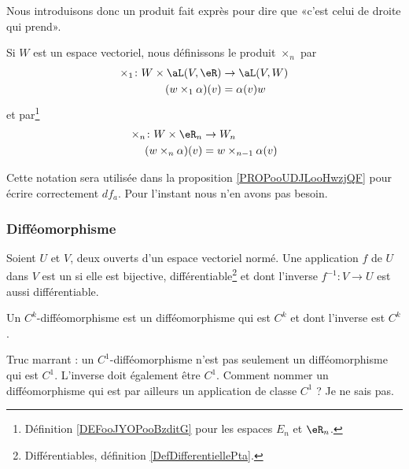 Nous introduisons donc un produit fait exprès pour dire que «c'est celui de droite qui prend».
\begin{definition}       \label{DEFooLULCooYjBEaZ}
	Si \( W\) est un espace vectoriel, nous définissons le produit \( \times_n\) par
	\begin{equation}
		\begin{aligned}
			\times_1\colon W\times \aL(V,\eR) & \to \aL(V,W) \\
			(w\times_1\alpha)(v)              & =\alpha(v)w
		\end{aligned}
	\end{equation}
	et par\footnote{Définition \ref{DEFooJYOPooBzditG} pour les espaces \( E_n\) et \( \eR_n\).}
	\begin{equation}
		\begin{aligned}
			\times_n\colon W\times \eR_n & \to W_n                  \\
			(w\times_n\alpha)(v)         & =w\times_{n-1} \alpha(v)
		\end{aligned}
	\end{equation}
\end{definition}
Cette notation sera utilisée dans la proposition \ref{PROPooUDJLooHwzjQF} pour écrire correctement \( df_a\). Pour l'instant nous n'en avons pas besoin.



\subsubsection{Difféomorphisme}


\begin{definition}[difféomorphisme]      \label{DefAQIQooYqZdya}
	Soient \( U\) et \( V\), deux ouverts d'un espace vectoriel normé. Une application \( f\) de \( U\) dans \( V\) est un  si elle est bijective, différentiable\footnote{Différentiables, définition \ref{DefDifferentiellePta}.} et dont l'inverse \( f^{-1}:V\to U \) est aussi différentiable.

	Un \( C^k\)-difféomorphisme est un difféomorphisme qui est \( C^k\) et dont l'inverse est \( C^k\).
\end{definition}

\begin{normaltext}
	Truc marrant : un \( C^1\)-difféomorphisme n'est pas seulement un difféomorphisme qui est \( C^1\). L'inverse doit également être \( C^1\). Comment nommer un difféomorphisme qui est par ailleurs un application de classe \( C^1\) ? Je ne sais pas.
\end{normaltext}

